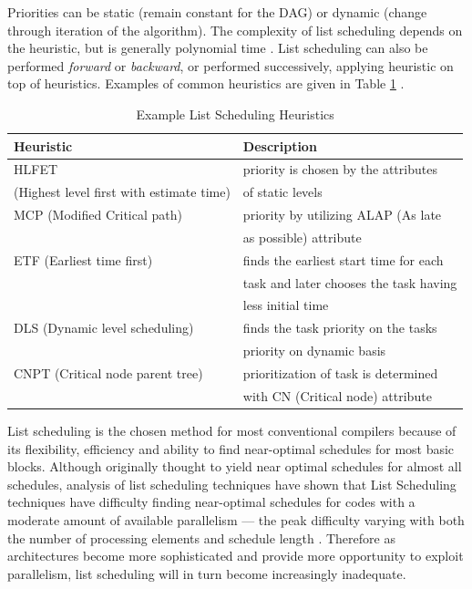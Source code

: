 \documentclass[12pt]{report}
\begin{document}
Priorities can be static (remain constant for the DAG) or dynamic (change
through iteration of the algorithm). The complexity of list scheduling
depends on the heuristic, but is generally polynomial time
\parencite{wang2018list}. List scheduling can also be performed \emph{forward} or
\emph{backward}, or performed successively, applying heuristic on top of
heuristics. Examples of common heuristics are given in Table
\ref{tab:ListHeuristics} \parencite{sarangal2018list}.



\begin{table}[htbp]
\caption{\label{tab:ListHeuristics}
Example List Scheduling Heuristics}
\centering
\begin{tabular}{ll}
\textbf{Heuristic} & \textbf{Description}\\
\hline
HLFET & priority is chosen by the attributes\\
(Highest level first with estimate time) & of static levels\\
\hline
MCP (Modified Critical path) & priority by utilizing ALAP (As late\\
 & as possible) attribute\\
\hline
ETF (Earliest time first) & finds the earliest start time for each\\
 & task and later chooses the task having\\
 & less initial time\\
\hline
DLS (Dynamic level scheduling) & finds the task priority on the tasks\\
 & priority on dynamic basis\\
\hline
CNPT (Critical node parent tree) & prioritization of task is determined\\
 & with CN (Critical node) attribute\\
\hline
\end{tabular}
\end{table}


List scheduling is the chosen method for most conventional compilers because
of its flexibility, efficiency and ability to find near-optimal schedules for
most basic blocks. Although originally thought to yield near optimal
schedules for almost all schedules, analysis of list scheduling techniques
have shown that List Scheduling techniques have difficulty finding
near-optimal schedules for codes with a moderate amount of available
parallelism --- the peak difficulty varying with both the number of
processing elements and schedule length \parencite{cooper1998experimental}.
Therefore as architectures become more sophisticated and provide more
opportunity to exploit parallelism, list scheduling will in turn become
increasingly inadequate.
\end{document}
